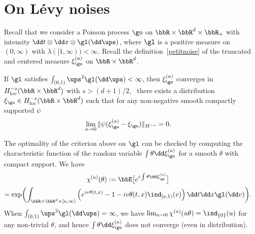 \appendix

\section{On Lévy noises}

Recall that we consider a Poisson process $\go$ on $\bbR\times \bbR^d \times \bbR_+$ with intensity
\hbox{$\dd t \otimes \dd x \otimes \gl(\dd \ups)$},
where $\gl$ is a positive measure on $(0,\infty)$ with $\lambda([1,\infty))<\infty$.
Recall the definition~\eqref{petitnoise} of the truncated and centered measure $\xi_{\go}^{(a)}$ on $\bbR\times \bbR^d$.

\begin{proposition}\label{convergence2}
If $\gl$ satisfies
$\int_{(0,1)} \ups^2 \gl(\dd \ups)<\infty$,
then $\xi^{(a)}_{\go}$ converges in \hbox{$H^{-s}_{\mathrm{loc}}(\bbR\times \bbR^d)$} with $s>(d+1)/2$, \ie \ there exists a distribution $\xi_{\go} \in H^{-s}_{\mathrm{loc}}(\bbR\times \bbR^d)$ such that
for any non-negative smooth compactly supported $\psi$
\begin{equation}
\lim_{a\to 0} \| \psi(\xi_{\go}^{(a)}-\xi_{\go}) \|_{H^{-s}}=0.
\end{equation}
\end{proposition}

\begin{rem}
\label{rem:noiseL2}
The optimality of the criterion above on $\gl$ can be checked by computing the characteristic function of the random variable $\int \theta \dd \xi_{\go}^{(a)}$ for a smooth $\theta$ with compact support. We have
\begin{multline*}
\chi^{(a)}(\theta):=\bbE\bigl[ e^{i \int \theta \dd \xi_{\go}^{(a)}} \bigr] \\
=\exp\biggl(\int_{ \bbR\times \bbR^d \times [a,\infty)} \left(e^{i v \theta(t,x)}-1-iv\theta(t,x)\ind_{[a,1)}(v)\right) \dd t \dd x \gl(\dd v)\biggr).
\end{multline*}
When $\int_{(0,1)} \ups^2 \gl(\dd \ups)=\infty$, we have $\lim_{a\to 0} \chi^{(a)}(u\theta)=\ind_{\{0\}}(u)$ for any non-trivial $\theta$, and hence $\int \theta \dd \xi_{\go}^{(a)}$ does not converge (even in distribution).
\end{rem}

